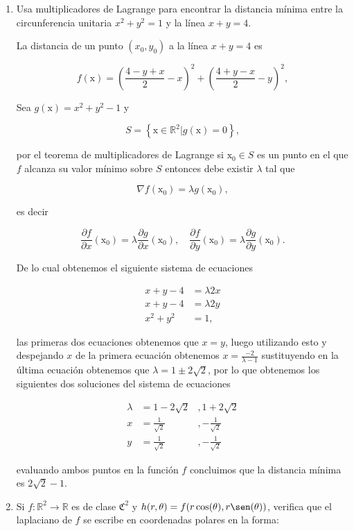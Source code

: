 \documentclass[letterpaper]{article}
\theoremstyle{definition}
\theoremstyle{lemathm}
\theoremstyle{lemathm}
\theoremstyle{lemademthm}
\newcommand{\pars}[1]{\left( #1 \right) }
\newcommand{\set}[1]{\left \{ #1 \right\} }
\newcommand{\R}{\mathbb{R}}
\newcommand{\1}{\mathbbm{1}}
\newcommand{\x}{\mathrm x}
\newcommand{\To}{\longrightarrow}
\begin{document}
\begin{enumerate}
\begin{proof}
		\end{proof}

		\item Usa multiplicadores de Lagrange para encontrar la distancia mínima entre la circunferencia unitaria $x^2+y^2=1$ y la línea  $x+y=4$.
		
		La distancia de un punto $(x_0,y_0)$ a la línea $x+y=4$ es

		\[f(\x) = \pars{\frac{4-y+x}{2} - x}^2 + \pars{\frac{4+y-x}{2} - y}^2,\]

		Sea $g(\x) = x^2+y^2-1$ y

		\[S = \set{\x \in \R^2 | g(\x) = 0},\]

		por el teorema de multiplicadores de Lagrange si $\x_0\in S$ es un punto en el que $f$ alcanza su valor mínimo sobre $S$ entonces debe existir $\lambda$ tal que

		\[\nabla f(\x_0) = \lambda g(\x_0),\]

		es decir

		\[\frac{\partial f}{\partial x}(\x_0) = \lambda\frac{\partial g}{\partial x}(\x_0), \quad \frac{\partial f}{\partial y}(\x_0) = \lambda\frac{\partial g}{\partial y}(\x_0).\]

		De lo cual obtenemos el siguiente sistema de ecuaciones

		\begin{align*}
			x+y-4 &= \lambda 2x\\
			x+y-4 &= \lambda 2y\\
			x^2+y^2 &= 1,
		\end{align*}

		las primeras dos ecuaciones obtenemos que $x = y$, luego utilizando esto y despejando $x$ de la primera ecuación obtenemos $x = \frac{-2}{\lambda-1}$ sustituyendo en la última ecuación obtenemos que $\lambda = 1 \pm 2\sqrt{2}$, por lo que obtenemos los siguientes dos soluciones del sistema de ecuaciones

		\begin{align*}
			\lambda &= 1-2\sqrt{2} &, 1+2\sqrt{2}\\
			x &= \frac{1}{\sqrt{2}} &, -\frac{1}{\sqrt{2}}\\
			y &= \frac{1}{\sqrt{2}} &, -\frac{1}{\sqrt{2}}
		\end{align*}

		evaluando ambos puntos en la función $f$ concluimos que la distancia mínima es $2\sqrt{2}-1$.
		
		\item Si $f:\R^2\To \R$ es de clase $\mathfrak{C}^2$ y $h(r,\theta)=f(r\cos(\theta),r\sen(\theta))$, verifica que el laplaciano de $f$ se escribe en coordenadas polares en la forma:
		

\end{enumerate}
\end{document}
